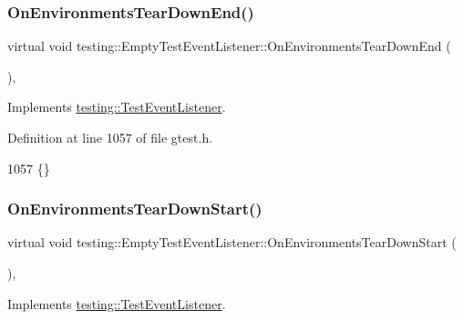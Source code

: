 \subsubsection{\texorpdfstring{On\+Environments\+Tear\+Down\+End()}{OnEnvironmentsTearDownEnd()}}
{\footnotesize\ttfamily virtual void testing\+::\+Empty\+Test\+Event\+Listener\+::\+On\+Environments\+Tear\+Down\+End (\begin{DoxyParamCaption}\item[{const \hyperlink{classtesting_1_1UnitTest}{Unit\+Test} \&}]{ }\end{DoxyParamCaption})\hspace{0.3cm}{\ttfamily [inline]}, {\ttfamily [virtual]}}



Implements \hyperlink{classtesting_1_1TestEventListener_a9ea04fa7f447865ba76df35e12ba2092}{testing\+::\+Test\+Event\+Listener}.



Definition at line 1057 of file gtest.\+h.


\begin{DoxyCode}
1057 \{\}
\end{DoxyCode}
\mbox{\label{classtesting_1_1EmptyTestEventListener_a00fa1a4ea5831e20746188414268e7c6}} 
\subsubsection{\texorpdfstring{On\+Environments\+Tear\+Down\+Start()}{OnEnvironmentsTearDownStart()}}
{\footnotesize\ttfamily virtual void testing\+::\+Empty\+Test\+Event\+Listener\+::\+On\+Environments\+Tear\+Down\+Start (\begin{DoxyParamCaption}\item[{const \hyperlink{classtesting_1_1UnitTest}{Unit\+Test} \&}]{ }\end{DoxyParamCaption})\hspace{0.3cm}{\ttfamily [inline]}, {\ttfamily [virtual]}}



Implements \hyperlink{classtesting_1_1TestEventListener_a468b5e6701bcb86cb2c956caadbba5e4}{testing\+::\+Test\+Event\+Listener}.



